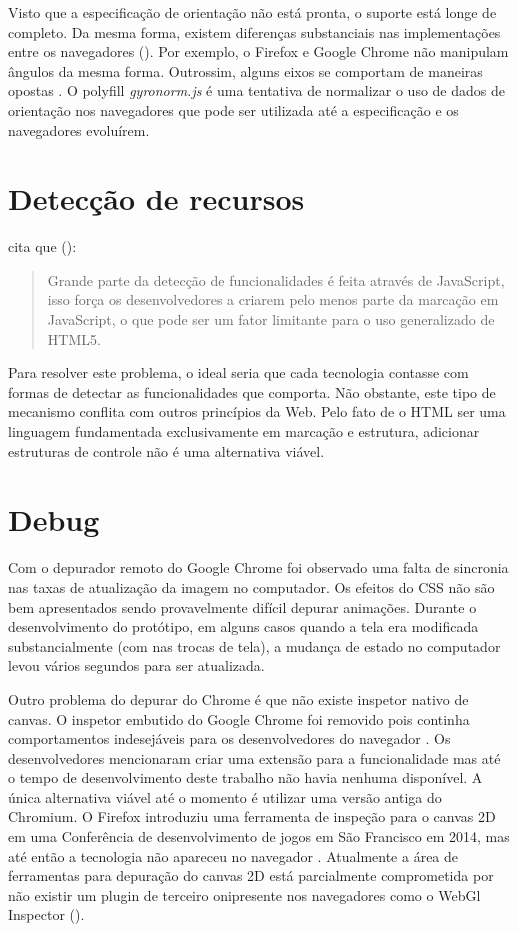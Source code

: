 Visto que a especificação de orientação não está pronta,
o suporte está longe de completo. Da mesma forma, existem
diferenças substanciais nas implementações entre os navegadores
(). Por exemplo, o Firefox e Google
Chrome não manipulam ângulos da mesma forma. Outrossim, alguns
eixos se comportam de maneiras opostas \autocite{mdnOrientation}. O
polyfill \textit{gyronorm.js} é uma tentativa de normalizar o uso de
dados de orientação nos navegadores que pode ser utilizada até a
especificação e os navegadores evoluírem.

\section{Detecção de recursos}

\citet{diveIntohtml} cita que ():
\begin{quote}
Grande parte da detecção de funcionalidades é feita através de
JavaScript, isso força os desenvolvedores a criarem pelo menos parte da
marcação em JavaScript, o que pode ser um fator limitante para o uso
generalizado de HTML5.
\end{quote}

Para resolver este problema, o ideal seria que cada tecnologia contasse
com formas de detectar as funcionalidades que comporta. Não obstante,
este tipo de mecanismo conflita com outros princípios da Web. Pelo
fato de o HTML ser uma linguagem fundamentada exclusivamente em marcação
e estrutura, adicionar estruturas de controle não é uma alternativa
viável.

\section{Debug}

Com o depurador remoto do Google Chrome foi observado uma falta de
sincronia nas taxas de atualização da imagem no computador. Os efeitos
do CSS não são bem apresentados sendo provavelmente difícil depurar
animações. Durante o desenvolvimento do protótipo, em alguns casos
quando a tela era modificada substancialmente (com nas trocas de tela),
a mudança de estado no computador levou vários segundos para ser
atualizada.

Outro problema do depurar do Chrome é que não existe inspetor
nativo de canvas. O inspetor embutido do Google Chrome foi
removido pois continha comportamentos indesejáveis para os
desenvolvedores do navegador \autocite{canvasinspector}. Os
desenvolvedores mencionaram criar uma extensão para a funcionalidade
mas até o tempo de desenvolvimento deste trabalho não havia
nenhuma disponível. A única alternativa viável até o momento é
utilizar uma versão antiga do Chromium. O Firefox introduziu uma
ferramenta de inspeção para o canvas 2D em uma Conferência de
desenvolvimento de jogos em São Francisco em 2014, mas até então a
tecnologia não apareceu no navegador \autocite{firefoxCanvasDebug}.
Atualmente a área de ferramentas para depuração do canvas
2D está parcialmente comprometida por não existir um plugin
de terceiro onipresente nos navegadores como o WebGl Inspector
().

